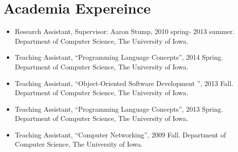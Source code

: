 \documentclass[10pt]{article}
\begin{document}
\section*{Academia Expereince}

\begin{itemize}
\item Research Assistant, Supervisor: Aaron Stump, 2010 spring- 2013 summer. Department of Computer Science, The University of Iowa.
\item Teaching Assistant,  ``Programming Language Concepts'', 2014 Spring. Department of Computer Science, The University of Iowa.
\item Teaching Assistant,  ``Object-Oriented Software Development '', 2013 Fall. Department of Computer Science, The University of Iowa.
\item Teaching Assistant,  ``Programming Language Concepts'', 2013 Spring. Department of Computer Science, The University of Iowa.
  \item Teaching Assistant, ``Computer Networking'', 2009 Fall. Department of Computer Science, The University of Iowa.
\end{itemize}
\end{document}
